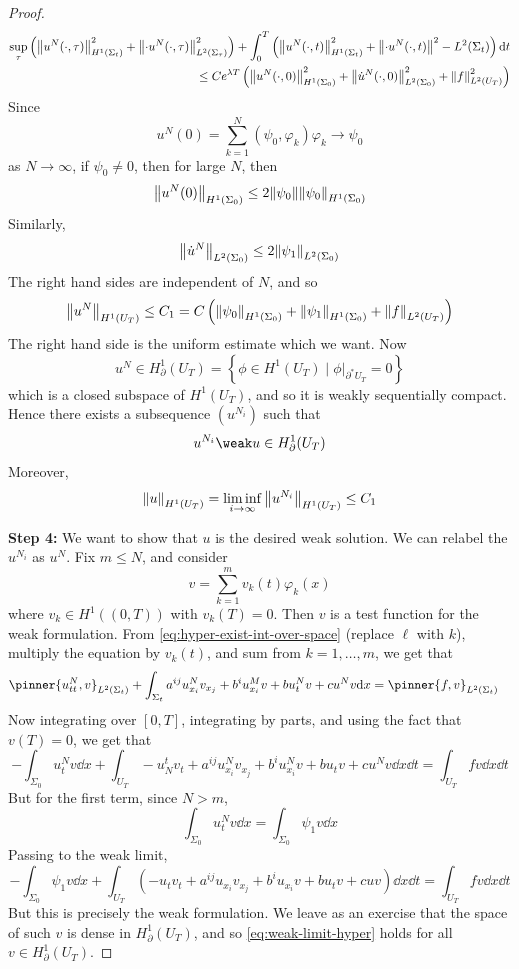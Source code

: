 \documentclass{article}
\begin{document}
\begin{proof}
    \begin{align*}
        \sup_\tau\left(\norm{u^N(\cdot, \tau)}^2_{H^1(\Sigma_t)} + \norm{\cdot u^N(\cdot, \tau)}^2_{L^2(\Sigma_\tau)}\right) + \int_{0}^T \left(\norm{u^N(\cdot, t)}^2_{H^1(\Sigma_t)} + \norm{\cdot u^N(\cdot, t)}^2-{L^2(\Sigma_t)}\right) \dd t \\
        \le Ce^{\lambda T}\left(\norm{u^N(\cdot, 0)}^2_{H^1(\Sigma_0)} + \norm{\dot u^N(\cdot, 0)}^2_{L^2(\Sigma_0)} + \norm{f}^2_{L^2(U_T)}\right)
    \end{align*}
    Since
    \[u^N(0) = \sum_{k=1}^N(\psi_0, \varphi_k)\varphi_k \to \psi_0\]
    as \(N \to \infty\), if \(\psi_0 \ne 0\), then for large \(N\), then
    \[\norm{u^N(0)}_{H^1(\Sigma_0)} \le 2\norm{\psi_0}\norm{\psi_0}_{H^1(\Sigma_0)}\]
    Similarly,
    \[\norm{\dot u^N}_{L^2(\Sigma_0)} \le 2\norm{\psi_1}_{L^2(\Sigma_0)}\]
    The right hand sides are independent of \(N\), and so
    \[\norm{u^N}_{H^1(U_T)} \le C_1 = C\left(\norm{\psi_0}_{H^1(\Sigma_0)} + \norm{\psi_1}_{H^1(\Sigma_0)} + \norm{f}_{L^2(U_T)}\right)\]
    The right hand side is the uniform estimate which we want.
\lec
    Now
    \[u^N \in H^1_\partial(U_T) = \left\{\phi \in H^1(U_T) \mid \phi\vert_{\partial^*U_T} = 0\right\}\]
    which is a closed subspace of \(H^1(U_T)\), and so it is weakly sequentially compact. Hence there exists a subsequence \((u^{N_i})\) such that
    \[u^{N_i} \weak u \in H^1_\partial(U_T)\]
    Moreover,
    \[\norm{u}_{H^1(U_T)} = \liminf_{i \to \infty}\norm{u^{N_i}}_{H^1(U_T)} \le C_1\]

    \textbf{Step 4:} We want to show that \(u\) is the desired weak solution. We can relabel the \(u^{N_i}\) as \(u^N\). Fix \(m \le N\), and consider
    \[v = \sum_{k=1}^m v_k(t)\varphi_k(x)\]
    where \(v_k \in H^1((0, T))\) with \(v_k(T) = 0\). Then \(v\) is a test function for the weak formulation. From \cref{eq:hyper-exist-int-over-space} (replace \(\ell\) with \(k\)), multiply the equation by \(v_k(t)\), and sum from \(k = 1, \dots, m\), we get that
    \begin{align*}
        \pinner{u^N_{tt}, v}_{L^2(\Sigma_t)} + \int_{\Sigma_t}a^{ij}u^N_{x_i}v_{x_j} + b^iu^M_{x_i}v + bu^N_tv+ cu^Nv \dd x &= \pinner{f, v}_{L^2(\Sigma_t)} 
    \end{align*}
    Now integrating over \([0, T]\), integrating by parts, and using the fact that \(v(T) = 0\), we get that
    \[-\int_{\Sigma_0}u^N_t v \dd x + \int_{U_T}-u_N^tv_t + a^{ij}u^N_{x_i}v_{x_j} + b^iu^N_{x_i}v + bu_tv + cu^Nv\dd x \dd t = \int_{U_T}fv \dd x \dd t\]
    But for the first term, since \(N > m\),
    \[\int_{\Sigma_0}u^N_tv \dd x = \int_{\Sigma_0}\psi_1 v \dd x\]
    Passing to the weak limit,
    \begin{equation}
        \label{eq:weak-limit-hyper}
        -\int_{\Sigma_0}\psi_1v\dd x + \int_{U_T}(-u_tv_t + a^{ij}u_{x_i}v_{x_j} + b^iu_{x_i}v + bu_t v + cuv)\dd x \dd t = \int_{U_T}fv\dd x\dd t
    \end{equation}
    But this is precisely the weak formulation. We leave as an exercise that the space of such \(v\) is dense in \(H^1_\partial(U_T)\), and so \cref{eq:weak-limit-hyper} holds for all \(v \in H^1_\partial(U_T)\).


\end{proof}
\end{document}
